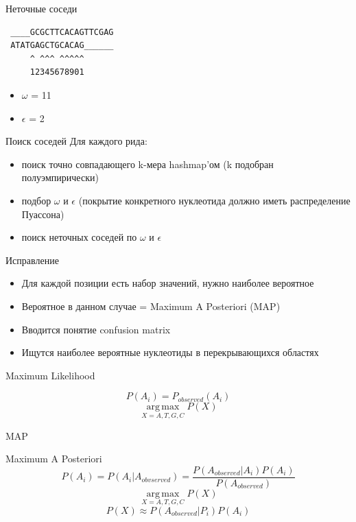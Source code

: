 \documentclass[10pt]{beamer}
\begin{document}
\begin{frame}[fragile]{Неточные соседи}
\begin{verbatim}
 ____GCGCTTCACAGTTCGAG
 ATATGAGCTGCACAG______
     ^ ^^^ ^^^^^
     12345678901
\end{verbatim}
  \begin{itemize}
    \item $\omega$ = 11
    \item $\epsilon$ = 2
  \end{itemize}
\end{frame}

\begin{frame}{Поиск соседей}
  Для каждого рида:
  \begin{itemize}
  \item поиск точно совпадающего k-мера hashmap'ом (k подобран полуэмпирически)
  \item подбор $\omega$ и $\epsilon$ (покрытие конкретного нуклеотида должно иметь распределение Пуассона)
  \item поиск неточных соседей по $\omega$ и $\epsilon$
  \end{itemize}
\end{frame}

\begin{frame}{Исправление}
  \begin{itemize}
  \item Для каждой позиции есть набор значений, нужно наиболее
    вероятное
  \item Вероятное в данном случае = Maximum A Posteriori (MAP)
  \item Вводится понятие confusion matrix
  \item Ищутся наиболее вероятные нуклеотиды в перекрывающихся областях
  \end{itemize}
\end{frame}

\begin{frame}{Maximum Likelihood}
  \begin{center}
    \Large
    \[P(A_i) = P_{observed}(A_i)\]
    \[\operatorname*{arg\,max}_{X=A,T,G,C} P(X)\]
  \end{center}
\end{frame}


\begin{frame}{MAP}
  \begin{center}
    \Large
    Maximum A Posteriori
    \[P(A_i) = P(A_i | A_{obvserved}) = \frac{P(A_{observed} | A_i)
      P(A_i)}{P(A_{observed})}\]
    \[\operatorname*{arg\,max}_{X=A,T,G,C} P(X)\]
    \[P(X) \approx P(A_{observed} | P_i) P(A_i)\]
  \end{center}
\end{frame}
\end{document}
